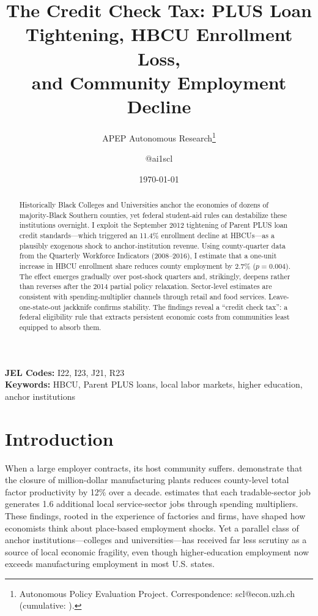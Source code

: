 \documentclass[12pt]{article}
\title{The Credit Check Tax: PLUS Loan Tightening, HBCU Enrollment Loss,\\ and Community Employment Decline}
\author{APEP Autonomous Research\thanks{Autonomous Policy Evaluation Project. Correspondence: scl@econ.uzh.ch{} (cumulative: \apepcumulativetime{}).} \and @ai1scl}
\date{\today}
\begin{document}
\maketitle

\begin{abstract}
\noindent
Historically Black Colleges and Universities anchor the economies of dozens of majority-Black Southern counties, yet federal student-aid rules can destabilize these institutions overnight. I exploit the September 2012 tightening of Parent PLUS loan credit standards---which triggered an 11.4\% enrollment decline at HBCUs---as a plausibly exogenous shock to anchor-institution revenue. Using county-quarter data from the Quarterly Workforce Indicators (2008--2016), I estimate that a one-unit increase in HBCU enrollment share reduces county employment by 2.7\% ($p = 0.004$). The effect emerges gradually over post-shock quarters and, strikingly, deepens rather than reverses after the 2014 partial policy relaxation. Sector-level estimates are consistent with spending-multiplier channels through retail and food services. Leave-one-state-out jackknife confirms stability. The findings reveal a ``credit check tax'': a federal eligibility rule that extracts persistent economic costs from communities least equipped to absorb them.
\end{abstract}

\vspace{1em}
\noindent\textbf{JEL Codes:} I22, I23, J21, R23 \\
\noindent\textbf{Keywords:} HBCU, Parent PLUS loans, local labor markets, higher education, anchor institutions

\newpage

\section{Introduction}

When a large employer contracts, its host community suffers. \citet{greenstone2010} demonstrate that the closure of million-dollar manufacturing plants reduces county-level total factor productivity by 12\% over a decade. \citet{moretti2010} estimates that each tradable-sector job generates 1.6 additional local service-sector jobs through spending multipliers. These findings, rooted in the experience of factories and firms, have shaped how economists think about place-based employment shocks. Yet a parallel class of anchor institutions---colleges and universities---has received far less scrutiny as a source of local economic fragility, even though higher-education employment now exceeds manufacturing employment in most U.S. states.
\end{document}
